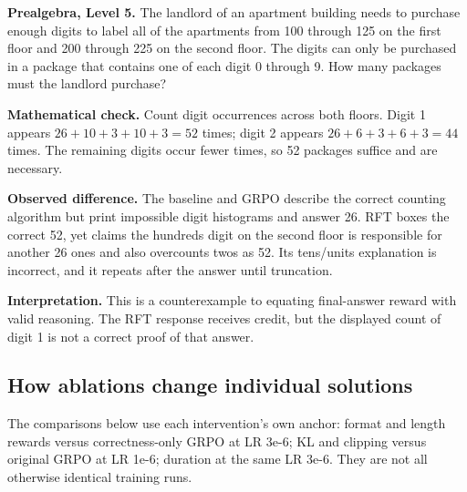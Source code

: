 \textbf{Prealgebra, Level 5.} The landlord of an apartment building needs to purchase enough digits to label all of the apartments from 100 through 125 on the first floor and 200 through 225 on the second floor. The digits can only be purchased in a package that contains one of each digit 0 through 9. How many packages must the landlord purchase?

\textbf{Mathematical check.} Count digit occurrences across both floors. Digit 1 appears $26+10+3+10+3=52$ times; digit 2 appears $26+6+3+6+3=44$ times. The remaining digits occur fewer times, so 52 packages suffice and are necessary.

\textbf{Observed difference.} The baseline and GRPO describe the correct counting algorithm but print impossible digit histograms and answer 26. RFT boxes the correct 52, yet claims the hundreds digit on the second floor is responsible for another 26 ones and also overcounts twos as 52. Its tens/units explanation is incorrect, and it repeats after the answer until truncation.

\textbf{Interpretation.} This is a counterexample to equating final-answer reward with valid reasoning. The RFT response receives credit, but the displayed count of digit 1 is not a correct proof of that answer.

\clearpage\subsection*{How ablations change individual solutions}

The comparisons below use each intervention's own anchor: format and length rewards versus correctness-only GRPO at LR 3e-6; KL and clipping versus original GRPO at LR 1e-6; duration at the same LR 3e-6. They are not all otherwise identical training runs.


